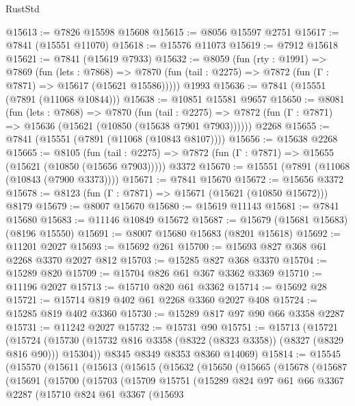 \begin{lexlean}{RustStd}
\begin{coremodule}
@15613 := @7826 @15598 @15608
@15615 := @8056 @15597 @2751
@15617 := @7841 (@15551 @11070)
@15618 := @15576 @11073
@15619 := @7912 @15618
@15621 := @7841 (@15619 @7933)
@15632 := @8059
    (fun (rty : @1991) =>
    @7869
      (fun (lets : @7868) =>
      @7870 (fun (tail : @2275) => @7872 (fun (Γ : @7871) => @15617 (@15621 @15586)))))
    @1993
@15636 := @7841 (@15551 (@7891 (@11068 @10844)))
@15638 := @10851 @15581 @9657
@15650 := @8081
    (fun (lets : @7868) =>
    @7870
      (fun (tail : @2275) =>
      @7872 (fun (Γ : @7871) => @15636 (@15621 (@10850 (@15638 @7901 @7903))))))
    @2268
@15655 := @7841 (@15551 (@7891 (@11068 (@10843 @8107))))
@15656 := @15638 @2268
@15665 := @8105
    (fun (tail : @2275) => @7872 (fun (Γ : @7871) => @15655 (@15621 (@10850 (@15656 @7903)))))
    @3372
@15670 := @15551 (@7891 (@11068 (@10843 (@7900 @3373))))
@15671 := @7841 @15670
@15672 := @15656 @3372
@15678 := @8123 (fun (Γ : @7871) => @15671 (@15621 (@10850 @15672))) @8179
@15679 := @8007 @15670
@15680 := @15619 @11143
@15681 := @7841 @15680
@15683 := @11146 @10849 @15672
@15687 := @15679 (@15681 @15683) (@8196 @15550)
@15691 := @8007 @15680 @15683 (@8201 @15618)
@15692 := @11201 @2027
@15693 := @15692 @261
@15700 := @15693 @827 @368 @61 @2268 @3370 @2027 @812
@15703 := @15285 @827 @368 @3370
@15704 := @15289 @820
@15709 := @15704 @826 @61 @367 @3362 @3369
@15710 := @11196 @2027
@15713 := @15710 @820 @61 @3362
@15714 := @15692 @28
@15721 := @15714 @819 @402 @61 @2268 @3360 @2027 @408
@15724 := @15285 @819 @402 @3360
@15730 := @15289 @817 @97 @90 @66 @3358 @2287
@15731 := @11242 @2027
@15732 := @15731 @90
@15751 := @15713
    (@15721
      (@15724 (@15730 (@15732 @816 @3358 (@8322 (@8323 @3358)) (@8327 (@8329 @816 @90))) @15304))
      @8345
      @8349
      @8353
      @8360
      @14069)
@15814 := @15545
    (@15570
      (@15611
        (@15613
          (@15615
            (@15632
              (@15650
                (@15665
                  (@15678
                    (@15687
                      (@15691
                        (@15700
                          (@15703
                            (@15709
                              @15751
                              (@15289
                                @824
                                @97
                                @61
                                @66
                                @3367
                                @2287
                                (@15710
                                  @824
                                  @61
                                  @3367
                                  (@15693

\end{coremodule}
\end{lexlean}
